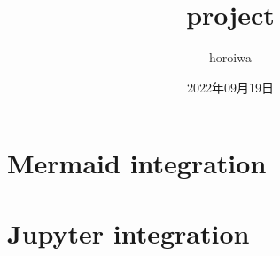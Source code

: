 \documentclass[letterpaper,10pt,dvipdfmx]{sphinxmanual}
\title{project}
\date{2022年09月19日}
\author{horoiwa}
\begin{document}
\pagestyle{empty}
\sphinxmaketitle
\pagestyle{plain}
\sphinxtableofcontents
\pagestyle{normal}
\label{\detokenize{index::doc}}



\chapter{Mermaid integration}
\label{\detokenize{index:mermaid-integration}}

\begin{DUlineblock}{0em}
\item[] 
\end{DUlineblock}


\chapter{Jupyter integration}
\label{\detokenize{index:jupyter-integration}}
\sphinxstepscope
\end{document}
